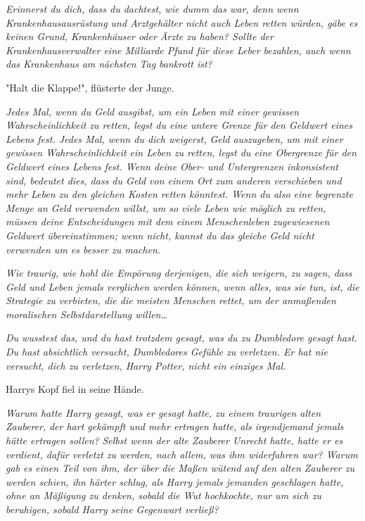 {\emph{Erinnerst du dich, dass du dachtest, wie dumm das war, denn wenn Krankenhausausrüstung und Arztgehälter nicht auch Leben retten würden, gäbe es keinen Grund, Krankenhäuser oder Ärzte zu haben? Sollte der Krankenhausverwalter eine Milliarde Pfund für diese Leber bezahlen, auch wenn das Krankenhaus am nächsten Tag bankrott ist?}

"Halt die Klappe!", flüsterte der Junge.

\emph{Jedes Mal, wenn du Geld ausgibst, um ein Leben mit einer gewissen Wahrscheinlichkeit zu retten, legst du eine untere Grenze für den Geldwert eines Lebens fest. Jedes Mal, wenn du dich weigerst, Geld auszugeben, um mit einer gewissen Wahrscheinlichkeit ein Leben zu retten, legst du eine Obergrenze für den Geldwert eines Lebens fest. Wenn deine Ober- und Untergrenzen inkonsistent sind, bedeutet dies, dass du Geld von einem Ort zum anderen verschieben und mehr Leben zu den gleichen Kosten retten könntest. Wenn du also eine begrenzte Menge an Geld verwenden willst, um so viele Leben wie möglich zu retten, müssen deine Entscheidungen mit dem einem Menschenleben zugewiesenen Geldwert übereinstimmen; wenn nicht, kannst du das gleiche Geld nicht verwenden um es besser zu machen.}

\emph{Wie traurig, wie hohl die Empörung derjenigen, die sich weigern, zu sagen, dass Geld und Leben jemals verglichen werden können, wenn alles, was sie tun, ist, die Strategie zu verbieten, die die meisten Menschen rettet, um der anmaßenden moralischen Selbstdarstellung willen…}

\emph{Du wusstest das, und du hast trotzdem gesagt, was du zu Dumbledore gesagt hast. Du hast absichtlich versucht, Dumbledores Gefühle zu verletzen. Er hat nie versucht, dich zu verletzen, Harry Potter, nicht ein einziges Mal.}

Harrys Kopf fiel in seine Hände.

\emph{Warum hatte Harry gesagt, was er gesagt hatte, zu einem traurigen alten Zauberer,} \emph{der hart gekämpft und mehr ertragen hatte, als irgendjemand jemals hätte ertragen sollen?} \emph{Selbst wenn der alte Zauberer Unrecht hatte, hatte er es verdient, dafür verletzt zu werden, nach allem, was ihm widerfahren war? Warum gab es einen Teil von ihm, der über die Maßen wütend auf den alten Zauberer zu werden schien, ihn härter schlug, als Harry jemals jemanden geschlagen hatte, ohne an Mäßigung zu denken, sobald die Wut hochkochte, nur um sich zu beruhigen, sobald Harry seine Gegenwart verließ?}

}
